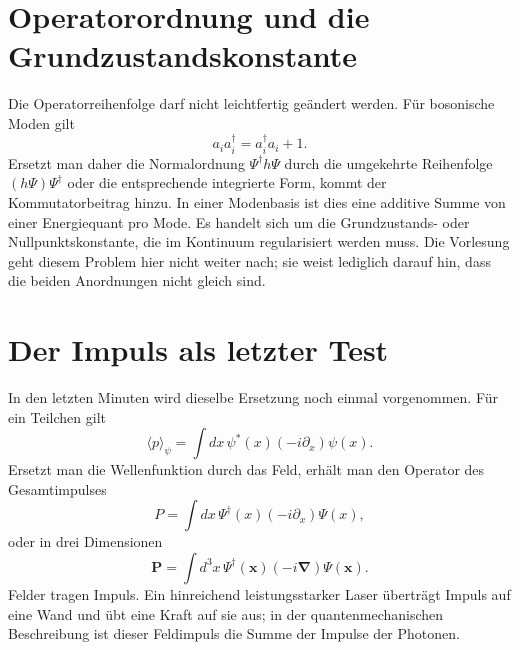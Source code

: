 \section{Operatorordnung und die Grundzustandskonstante}

Die Operatorreihenfolge darf nicht leichtfertig geändert werden. Für bosonische Moden gilt
\begin{equation}
a_i a_i^\dagger=a_i^\dagger a_i+1.
\end{equation}
Ersetzt man daher die Normalordnung \(\Psi^\dagger h\Psi\) durch die umgekehrte Reihenfolge \((h\Psi)\Psi^\dagger\) oder die entsprechende integrierte Form, kommt der Kommutatorbeitrag hinzu. In einer Modenbasis ist dies eine additive Summe von einer Energiequant pro Mode. Es handelt sich um die Grundzustands- oder Nullpunktskonstante, die im Kontinuum regularisiert werden muss. Die Vorlesung geht diesem Problem hier nicht weiter nach; sie weist lediglich darauf hin, dass die beiden Anordnungen nicht gleich sind.

\begin{classroomqa}
\end{classroomqa}

\section{Der Impuls als letzter Test}

In den letzten Minuten wird dieselbe Ersetzung noch einmal vorgenommen. Für ein Teilchen gilt
\begin{equation}
\langle p\rangle_\psi
=\int dx\,\psi^*(x)\left(-i\partial_x\right)\psi(x).
\label{eq:l07-one-particle-momentum}
\end{equation}
Ersetzt man die Wellenfunktion durch das Feld, erhält man den Operator des Gesamtimpulses
\begin{equation}
P=\int dx\,\Psi^\dagger(x)\left(-i\partial_x\right)\Psi(x),
\label{eq:l07-field-momentum}
\end{equation}
oder in drei Dimensionen
\begin{equation}
\mathbf P=\int d^3x\,\Psi^\dagger(\mathbf x)
\left(-i\boldsymbol\nabla\right)\Psi(\mathbf x).
\end{equation}
Felder tragen Impuls. Ein hinreichend leistungsstarker Laser überträgt Impuls auf eine Wand und übt eine Kraft auf sie aus; in der quantenmechanischen Beschreibung ist dieser Feldimpuls die Summe der Impulse der Photonen.

